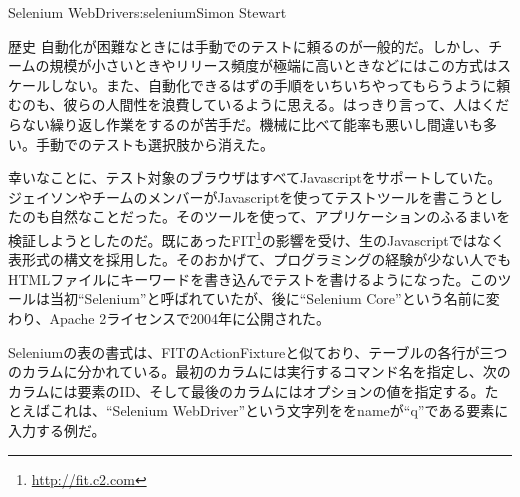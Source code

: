 \begin{aosachapter}{Selenium WebDriver}{s:selenium}{Simon Stewart}
\begin{aosasect1}{歴史}
自動化が困難なときには手動でのテストに頼るのが一般的だ。しかし、チームの規模が小さいときやリリース頻度が極端に高いときなどにはこの方式はスケールしない。また、自動化できるはずの手順をいちいちやってもらうように頼むのも、彼らの人間性を浪費しているように思える。はっきり言って、人はくだらない繰り返し作業をするのが苦手だ。機械に比べて能率も悪いし間違いも多い。手動でのテストも選択肢から消えた。

幸いなことに、テスト対象のブラウザはすべてJavascriptをサポートしていた。ジェイソンやチームのメンバーがJavascriptを使ってテストツールを書こうとしたのも自然なことだった。そのツールを使って、アプリケーションのふるまいを検証しようとしたのだ。既にあったFIT\footnote{\url{http://fit.c2.com}}の影響を受け、生のJavascriptではなく表形式の構文を採用した。そのおかげて、プログラミングの経験が少ない人でもHTMLファイルにキーワードを書き込んでテストを書けるようになった。このツールは当初``Selenium''と呼ばれていたが、後に``Selenium Core''という名前に変わり、Apache 2ライセンスで2004年に公開された。

Seleniumの表の書式は、FITのActionFixtureと似ており、テーブルの各行が三つのカラムに分かれている。最初のカラムには実行するコマンド名を指定し、次のカラムには要素のID、そして最後のカラムにはオプションの値を指定する。たとえばこれは、``Selenium WebDriver''という文字列ををnameが``q''である要素に入力する例だ。


\end{aosasect1}
\end{aosachapter}
